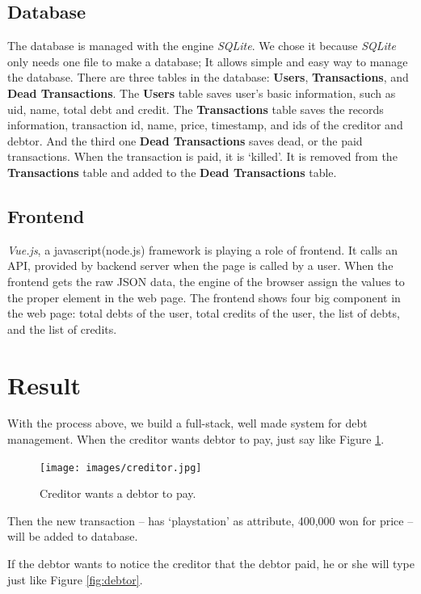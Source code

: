 \documentclass[11pt]{article}
\begin{document}
\subsection{Database}
The database is managed with the engine \textit{SQLite}.
We chose it because \textit{SQLite} only needs one file to make a database;
It allows simple and easy way to manage the database.
There are three tables in the database: \textbf{Users}, \textbf{Transactions},
and \textbf{Dead Transactions}.
The \textbf{Users} table saves user's basic information,
such as uid, name, total debt and credit.
The \textbf{Transactions} table saves the records information,
transaction id, name, price, timestamp, and ids of the creditor and debtor.
And the third one \textbf{Dead Transactions} saves dead, or the paid transactions.
When the transaction is paid, it is `killed'.
It is removed from the \textbf{Transactions} table and added to the 
\textbf{Dead Transactions} table.

\subsection{Frontend}
\textit{Vue.js}, a javascript(node.js) framework is playing a role of frontend.
It calls an API, provided by backend server when the page is called by a user.
When the frontend gets the raw JSON data, the engine of the browser
assign the values to the proper element in the web page.
The frontend shows four big component in the web page: total debts of the user,
total credits of the user, the list of debts, and the list of credits.

\section{Result}
With the process above, we build a full-stack, well made system for debt management.
When the creditor wants debtor to pay, just say like Figure \ref{fig:creditor}.

\begin{figure}[!htbp]
  \centering
  \texttt{[image: images/creditor.jpg]}
  \caption{Creditor wants a debtor to pay.}
  \label{fig:creditor}
\end{figure}

Then the new transaction -- has `playstation' as attribute, 400,000 won for
price -- will be added to database.

If the debtor wants to notice the creditor that the debtor paid,
he or she will type just like Figure \ref{fig:debtor}.
\end{document}
